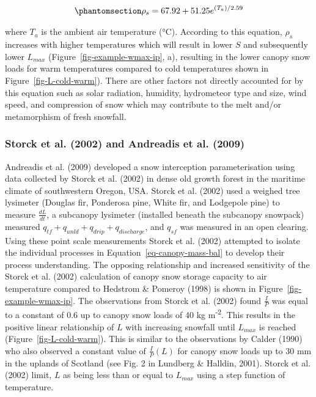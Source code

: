 \documentclass[
  letterpaper,
]{tex/uofsthesis-cs}
\begin{document}
\begin{equation}\phantomsection\label{eq-rhoSnow}{
\rho_s = 67.92 + 51.25 e ^{(T_{a})/2.59}
}\end{equation}

where \(T_a\) is the ambient air temperature (°C). According to this
equation, \(\rho_s\) increases with higher temperatures which will
result in lower \(S\) and subsequently lower \(L_{max}\)
(Figure~\ref{fig-example-wmax-ip}, a), resulting in the lower canopy
snow loads for warm temperatures compared to cold temperatures shown in
Figure~\ref{fig-L-cold-warm}). There are other factors not directly
accounted for by this equation such as solar radiation, humidity,
hydrometeor type and size, wind speed, and compression of snow which may
contribute to the melt and/or metamorphism of fresh snowfall.

\subsubsection{Storck et al. (2002) and Andreadis et al.
(2009)}\label{storck2002-and-andreadis2009}

Andreadis et al. (2009) developed a snow interception parameterisation
using data collected by Storck et al. (2002) in dense old growth forest
in the maritime climate of southwestern Oregon, USA. Storck et al.
(2002) used a weighed tree lysimeter (Douglas fir, Ponderosa pine, White
fir, and Lodgepole pine) to measure \(\frac{dL}{dt}\), a subcanopy
lysimeter (installed beneath the subcanopy snowpack) measured
\(q_{tf}+q_{unld}+q_{drip}+q_{discharge}\), and \(q_{sf}\) was measured
in an open clearing. Using these point scale measurements Storck et al.
(2002) attempted to isolate the individual processes in
Equation~\ref{eq-canopy-mass-bal} to develop their process
understanding. The opposing relationship and increased sensitivity of
the Storck et al. (2002) calculation of canopy snow storage capacity to
air temperature compared to Hedstrom \& Pomeroy (1998) is shown in
Figure~\ref{fig-example-wmax-ip}. The observations from Storck et al.
(2002) found \(\frac{I}{P}\) was equal to a constant of 0.6 up to canopy
snow loads of 40 kg m\textsuperscript{-2}. This results in the positive
linear relationship of \(L\) with increasing snowfall until \(L_{max}\)
is reached (Figure~\ref{fig-L-cold-warm}). This is similar to the
observations by Calder (1990) who also observed a constant value of
\(\frac{I}{P}(L)\) for canopy snow loads up to 30 mm in the uplands of
Scotland (see Fig. 2 in Lundberg \& Halldin, 2001). Storck et al. (2002)
limit, \(L\) as being less than or equal to \(L_{max}\) using a step
function of temperature.
\end{document}
